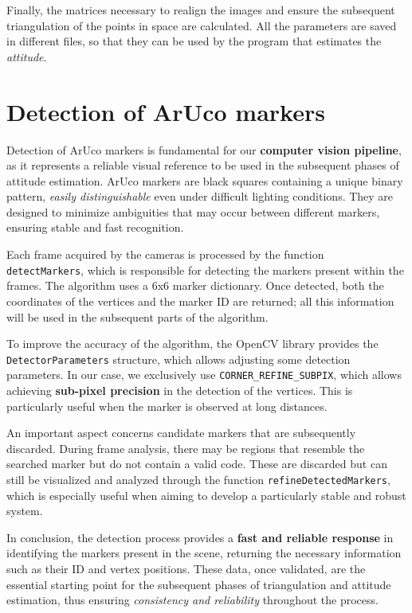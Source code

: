 Finally, the matrices necessary to realign the images and ensure the subsequent triangulation of the points in space are calculated. All the parameters are saved in different files, so that they can be used by the program that estimates the \textit{attitude}.

\section{Detection of ArUco markers}

Detection of ArUco markers is fundamental for our \textbf{computer vision pipeline}, as it represents a reliable visual reference to be used in the subsequent phases of attitude estimation. ArUco markers are black squares containing a unique binary pattern, \textit{easily distinguishable} even under difficult lighting conditions. They are designed to minimize ambiguities that may occur between different markers, ensuring stable and fast recognition.

Each frame acquired by the cameras is processed by the function\\ \texttt{detectMarkers}, which is responsible for detecting the markers present within the frames. The algorithm uses a 6x6 marker dictionary. Once detected, both the coordinates of the vertices and the marker ID are returned; all this information will be used in the subsequent parts of the algorithm.

To improve the accuracy of the algorithm, the OpenCV library provides the \texttt{DetectorParameters} structure, which allows adjusting some detection parameters. In our case, we exclusively use \texttt{CORNER\_REFINE\_SUBPIX}, which allows achieving \textbf{sub-pixel precision} in the detection of the vertices. This is particularly useful when the marker is observed at long distances.

An important aspect concerns candidate markers that are subsequently discarded. During frame analysis, there may be regions that resemble the searched marker but do not contain a valid code. These are discarded but can still be visualized and analyzed through the function \texttt{refineDetectedMarkers}, which is especially useful when aiming to develop a particularly stable and robust system.

In conclusion, the detection process provides a \textbf{fast and reliable response} in identifying the markers present in the scene, returning the necessary information such as their ID and vertex positions. These data, once validated, are the essential starting point for the subsequent phases of triangulation and attitude estimation, thus ensuring \textit{consistency and reliability} throughout the process.

